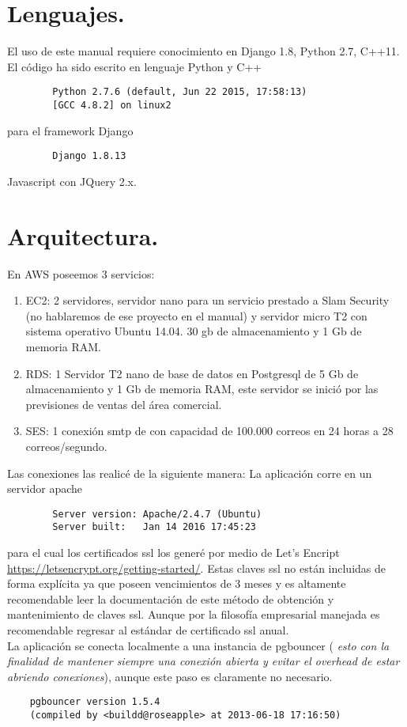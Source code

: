 \documentclass[10pt,a4paper]{book}
\begin{document}
	
	\section{Lenguajes.}
	El uso de este manual requiere conocimiento en Django 1.8, Python 2.7, C++11.
	El código ha sido escrito en lenguaje Python y C++
	\begin{verbatim}
		Python 2.7.6 (default, Jun 22 2015, 17:58:13) 
		[GCC 4.8.2] on linux2
	\end{verbatim}
	para el framework Django 
	\begin{verbatim}
		Django 1.8.13
	\end{verbatim}
	Javascript con JQuery 2.x.
	
	\section{Arquitectura.}
	En AWS poseemos 3 servicios:
	\begin{enumerate}
		\item EC2: 2 servidores, servidor nano para un servicio prestado a Slam Security (no hablaremos de ese proyecto en el manual) y servidor micro T2 con sistema operativo Ubuntu 14.04. 30 gb de almacenamiento y 1 Gb de memoria RAM.
		\item RDS: 1 Servidor T2 nano de base de datos en Postgresql de 5 Gb de almacenamiento y 1 Gb de memoria RAM, este servidor se inició por las previsiones de ventas del área comercial.
		\item SES: 1 conexión smtp de con capacidad de 100.000 correos en 24 horas a 28 correos/segundo.
	\end{enumerate}
	
	Las conexiones las realicé de la siguiente manera: La aplicación corre en un servidor apache
	\begin{verbatim}
		Server version: Apache/2.4.7 (Ubuntu)
		Server built:   Jan 14 2016 17:45:23
	\end{verbatim}
	para el cual los certificados ssl los generé por medio de Let's Encript \url{https://letsencrypt.org/getting-started/}. Estas claves ssl no están incluidas de forma explícita ya que poseen vencimientos de 3 meses y es altamente recomendable leer la documentación de este método de obtención y mantenimiento de claves ssl. Aunque por la filosofía empresarial manejada es recomendable regresar al estándar de certificado ssl anual.\\
	
	La aplicación se conecta localmente a una instancia de pgbouncer ( \textit{esto con la finalidad de mantener siempre una conexión abierta y evitar el overhead de estar abriendo conexiones}), aunque este paso es claramente no necesario.
	\begin{verbatim}
	pgbouncer version 1.5.4
	(compiled by <buildd@roseapple> at 2013-06-18 17:16:50)
	\end{verbatim}
	
\end{document}
